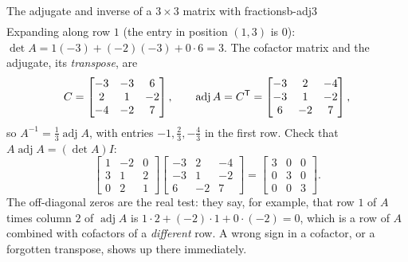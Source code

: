 \documentclass[11pt]{article}
\begin{document}
\begin{exmp}{The adjugate and inverse of a $3\times3$ matrix with fractions}{b-adj3}
\begin{align*}
\end{align*}
Expanding along row $1$ (the entry in position $(1,3)$ is $0$): $\det A=1(-3)+(-2)(-3)+0\cdot6=3$. The cofactor matrix and the adjugate, its \emph{transpose}, are
\[
C=\begin{bmatrix}-3&-3&6\\2&1&-2\\-4&-2&7\end{bmatrix},\qquad
\operatorname{adj}A=C^{\mathsf T}=\begin{bmatrix}-3&2&-4\\-3&1&-2\\6&-2&7\end{bmatrix},
\]
so $A^{-1}=\frac13\operatorname{adj}A$, with entries $-1,\tfrac23,-\tfrac43$ in the first row. Check that $A\operatorname{adj}A=(\det A)I$:
\[
\begin{bmatrix}1&-2&0\\3&1&2\\0&2&1\end{bmatrix}\begin{bmatrix}-3&2&-4\\-3&1&-2\\6&-2&7\end{bmatrix}=\begin{bmatrix}3&0&0\\0&3&0\\0&0&3\end{bmatrix}.
\]
The off-diagonal zeros are the real test: they say, for example, that row $1$ of $A$ times column $2$ of $\operatorname{adj}A$ is $1\cdot2+(-2)\cdot1+0\cdot(-2)=0$, which is a row of $A$ combined with cofactors of a \emph{different} row. A wrong sign in a cofactor, or a forgotten transpose, shows up there immediately.
\end{exmp}
\end{document}
